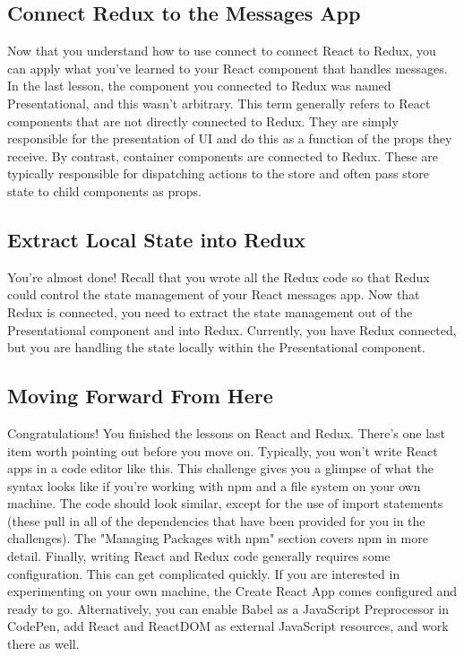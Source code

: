 \documentclass{article}%
\begin{document}
%
\subsection{Connect Redux to the Messages App}%
\label{subsec:ConnectReduxtotheMessagesApp}%
Now that you understand how to use connect to connect React to Redux, you can apply what you've learned to your React component that handles messages.\newline%
In the last lesson, the component you connected to Redux was named Presentational, and this wasn't arbitrary. This term generally refers to React components that are not directly connected to Redux. They are simply responsible for the presentation of UI and do this as a function of the props they receive. By contrast, container components are connected to Redux. These are typically responsible for dispatching actions to the store and often pass store state to child components as props.\newline%

%
\subsection{Extract Local State into Redux}%
\label{subsec:ExtractLocalStateintoRedux}%
You're almost done! Recall that you wrote all the Redux code so that Redux could control the state management of your React messages app. Now that Redux is connected, you need to extract the state management out of the Presentational component and into Redux. Currently, you have Redux connected, but you are handling the state locally within the Presentational component.\newline%

%
\subsection{Moving Forward From Here}%
\label{subsec:MovingForwardFromHere}%
Congratulations! You finished the lessons on React and Redux. There's one last item worth pointing out before you move on. Typically, you won't write React apps in a code editor like this. This challenge gives you a glimpse of what the syntax looks like if you're working with npm and a file system on your own machine. The code should look similar, except for the use of import statements (these pull in all of the dependencies that have been provided for you in the challenges). The "Managing Packages with npm" section covers npm in more detail.\newline%
Finally, writing React and Redux code generally requires some configuration. This can get complicated quickly. If you are interested in experimenting on your own machine, the\newline%
Create React App comes configured and ready to go.\newline%
Alternatively, you can enable Babel as a JavaScript Preprocessor in CodePen, add React and ReactDOM as external JavaScript resources, and work there as well.\newline%
\end{document}
